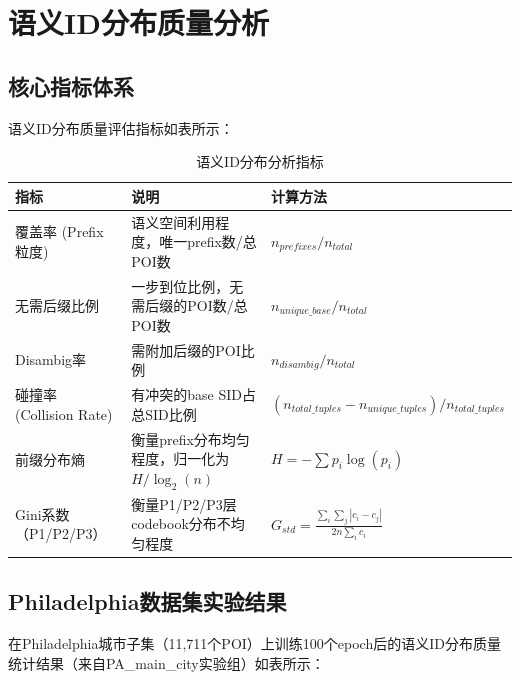 \section{语义ID分布质量分析}
\label{sec:sid_quality}

\subsection{核心指标体系}
\label{sec:sid_metrics}

语义ID分布质量评估指标如表所示：

\begin{table}[htbp]
\centering
\small
\caption{语义ID分布分析指标}
\label{tab:sid_metrics}
\begin{tabular}{lll}
\toprule
指标 & 说明 & 计算方法 \\
\midrule
覆盖率 (Prefix粒度) & 语义空间利用程度，唯一prefix数/总POI数 & $n_{prefixes} / n_{total}$ \\
无需后缀比例 & 一步到位比例，无需后缀的POI数/总POI数 & $n_{unique\_base} / n_{total}$ \\
Disambig率 & 需附加后缀的POI比例 & $n_{disambig} / n_{total}$ \\
碰撞率 (Collision Rate) & 有冲突的base SID占总SID比例 & $(n_{total\_tuples} - n_{unique\_tuples}) / n_{total\_tuples}$ \\
前缀分布熵 & 衡量prefix分布均匀程度，归一化为 $H/\log_2(n)$ & $H = -\sum p_i \log(p_i)$ \\
Gini系数（P1/P2/P3）& 衡量P1/P2/P3层codebook分布不均匀程度 & $G_{std} = \frac{\sum_{i}\sum_{j}|c_i-c_j|}{2n\sum_i c_i}$ \\
\bottomrule
\end{tabular}
\end{table}

\subsection{Philadelphia数据集实验结果}
\label{sec:philly_results}

在Philadelphia城市子集（11,711个POI）上训练100个epoch后的语义ID分布质量统计结果（来自PA\_main\_city实验组）如表所示：


